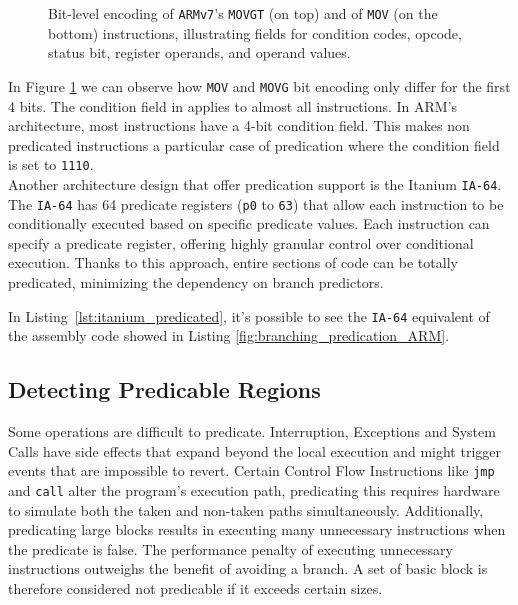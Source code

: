 \begin{figure}[H]
    \centering
    
    
    \caption{Bit-level encoding of \texttt{ARMv7}'s \texttt{MOVGT} (on top) and of \texttt{MOV} (on the bottom) instructions, illustrating fields for condition codes, opcode, status bit, register operands, and operand values.}
    \label{fig:mov_encoding}
\end{figure}

In Figure \ref{fig:mov_encoding} we can observe how \texttt{MOV} and \texttt{MOVG} bit encoding only differ for the first 4 bits. The condition field in \armvs applies to almost all instructions. In ARM's architecture, most instructions have a 4-bit condition field. This makes non predicated instructions a particular case of predication where the condition field is set to \texttt{1110}. \\

Another architecture design that offer predication support is the Itanium \texttt{IA-64}.
The \texttt{IA-64} has 64 predicate registers (\texttt{p0} to \texttt{63}) that allow each instruction to be conditionally executed based on specific predicate values. Each instruction can specify a predicate register, offering highly granular control over conditional execution. Thanks to this approach, entire sections of code can be totally predicated, minimizing the dependency on branch predictors.

\begin{center}
\begin{minipage}{0.5\textwidth}

\end{minipage}
\end{center}

In Listing~\ref{lst:itanium_predicated}, it's possible to see the \texttt{IA-64} equivalent of the assembly code showed in Listing \ref{fig:branching_predication_ARM}.

\subsection{Detecting Predicable Regions}
\label{sec:detecting_pred}

Some operations are difficult to predicate. Interruption, Exceptions and System Calls have side effects that expand beyond the local execution and might trigger events that are impossible to revert. Certain Control Flow Instructions like \texttt{jmp} and \texttt{call} alter the program's execution path, predicating this requires hardware to simulate both the taken and non-taken paths simultaneously.
Additionally, predicating large blocks results in executing many unnecessary instructions when the predicate is false. The performance penalty of executing unnecessary instructions outweighs the benefit of avoiding a branch. A set of basic block is therefore considered not predicable if it exceeds certain sizes.

